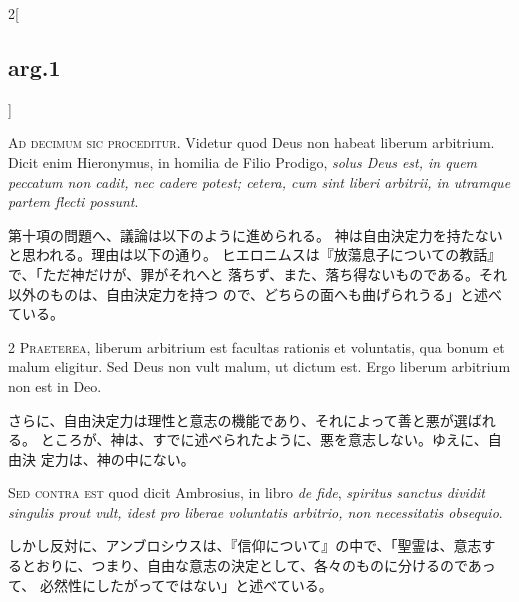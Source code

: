 \documentclass[paper=a4paper,fontsize=10pt,jafontsize=9pt,titlepage]{jlreq}
\begin{document}
\begin{paracol}{2}[\subsection{arg.1}]


{\huge A}{\scshape d decimum sic proceditur}. Videtur quod
Deus non habeat liberum arbitrium. Dicit enim Hieronymus, in homilia de
Filio Prodigo, {\itshape solus Deus est, in quem peccatum non cadit, nec cadere
potest; cetera, cum sint liberi arbitrii, in utramque partem flecti
possunt}.

\switchcolumn

第十項の問題へ、議論は以下のように進められる。
神は自由決定力を持たないと思われる。理由は以下の通り。
ヒエロニムスは『放蕩息子についての教話』で、「ただ神だけが、罪がそれへと
 落ちず、また、落ち得ないものである。それ以外のものは、自由決定力を持つ
 ので、どちらの面へも曲げられうる」と述べている。



{\scshape 2 Praeterea}, liberum arbitrium est facultas
rationis et voluntatis, qua bonum et malum eligitur. Sed Deus non vult
malum, ut dictum est. Ergo liberum arbitrium non est in Deo.

\switchcolumn

さらに、自由決定力は理性と意志の機能であり、それによって善と悪が選ばれる。
 ところが、神は、すでに述べられたように、悪を意志しない。ゆえに、自由決
 定力は、神の中にない。

\switchcolumn*[\subsection{s.c.}]


{\scshape Sed contra est} quod dicit Ambrosius, in
libro {\itshape de fide}, {\itshape spiritus sanctus dividit singulis prout vult, idest pro
liberae voluntatis arbitrio, non necessitatis obsequio}.

\switchcolumn

しかし反対に、アンブロシウスは、『信仰について』の中で、「聖霊は、意志す
 るとおりに、つまり、自由な意志の決定として、各々のものに分けるのであって、
 必然性にしたがってではない」と述べている。




\end{paracol}
\end{document}
